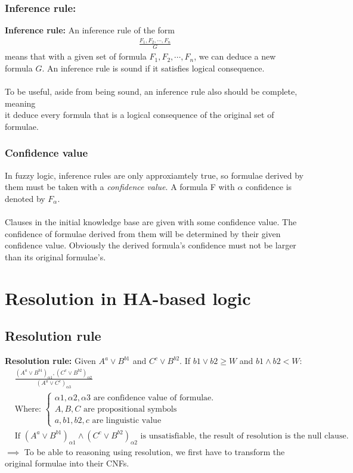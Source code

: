 \documentclass[26pt,fleqn,]{article}
\begin{document}
\subsubsection{Inference rule:}
{\bfseries Inference rule:} An inference rule of the form\\
\begin{align*}
	\frac{F_1, F_2,\cdots,F_n}{G}
\end{align*}
means that with a given set of formula \(F_1,F_2,\cdots,F_n\), we can deduce a 
new formula \(G\). An inference rule is sound if it satisfies logical consequence.\\\\
To be useful, aside from being sound, an inference rule also should be complete, meaning\\
it deduce every formula that is a logical consequence of the original set of formulae.\\
\subsubsection{Confidence value}
In fuzzy logic, inference rules are only approxiamtely true, so formulae derived by them must be
taken with a {\em confidence value}. A formula F with \(\alpha\) confidence is denoted by \(F_\alpha\).\\\\

Clauses in the initial knowledge base are given with some confidence value. The confidence of formulae
derived from them will be determined by their given confidence value. Obviously the derived formula's 
confidence must not be larger than its original formulae's.
%
%
\section{Resolution in HA-based logic}
\subsection{Resolution rule}
{\bfseries Resolution rule:} Given \(A^a \vee B^{b1}\) and \(C^c \vee B^{b2}\). If \(b1 \vee b2 
\ge W\) and \(b1 \wedge b2 < W\):
\begin{align*}
	&\frac{(A^a \vee B^{b1})_{\alpha 1}, (C^c \vee B^{b2})_{\alpha 2}} {(A^a \vee C^c)_{\alpha 3}}\\
	&\text{Where: }
	\begin{cases}
	\alpha 1, \alpha 2, \alpha 3 \text{ are confidence value of formulae.}\\
	A, B, C \text{ are propositional symbols}\\
	a, b1, b2, c \text{ are linguistic value}
	\end{cases}
	\\
	&\text{If } (A^a \vee B^{b1})_{\alpha 1} \wedge (C^c \vee B^{b2})_{\alpha 2} \text{ is 
	unsatisfiable, the result of resolution is the null clause.} 
\end{align*}
\(\implies\) To be able to reasoning using resolution, we first have to transform the original
formulae into their CNFs.\\
\end{document}
